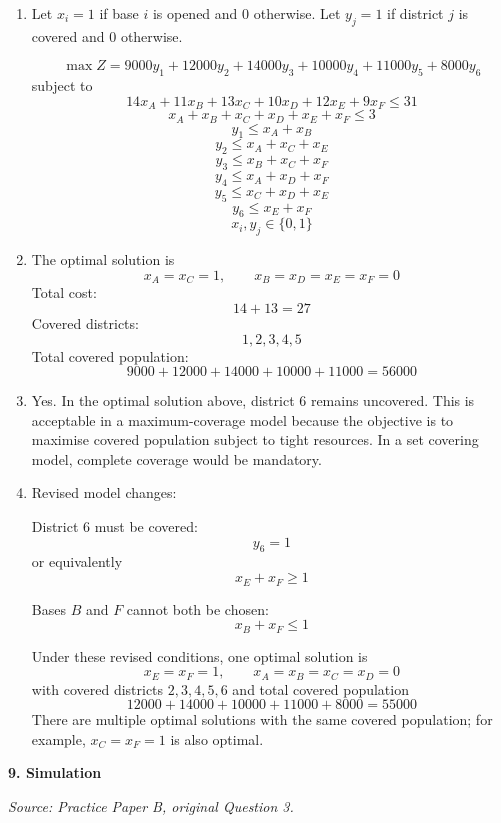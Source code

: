 \documentclass[11pt,a4paper]{article}
\begin{document}
\begin{enumerate}
\item Let $x_i=1$ if base $i$ is opened and 0 otherwise.
Let $y_j=1$ if district $j$ is covered and 0 otherwise.

\[
\max Z = 9000y_1+12000y_2+14000y_3+10000y_4+11000y_5+8000y_6
\]
subject to
\[
14x_A+11x_B+13x_C+10x_D+12x_E+9x_F \le 31
\]
\[
x_A+x_B+x_C+x_D+x_E+x_F \le 3
\]
\[
y_1 \le x_A+x_B
\]
\[
y_2 \le x_A+x_C+x_E
\]
\[
y_3 \le x_B+x_C+x_F
\]
\[
y_4 \le x_A+x_D+x_F
\]
\[
y_5 \le x_C+x_D+x_E
\]
\[
y_6 \le x_E+x_F
\]
\[
x_i,y_j \in \{0,1\}
\]

\item The optimal solution is
\[
x_A=x_C=1,\qquad x_B=x_D=x_E=x_F=0
\]
Total cost:
\[
14+13=27
\]
Covered districts:
\[
1,2,3,4,5
\]
Total covered population:
\[
9000+12000+14000+10000+11000=56000
\]

\item Yes. In the optimal solution above, district 6 remains uncovered. This is acceptable in a maximum-coverage model because the objective is to maximise covered population subject to tight resources. In a set covering model, complete coverage would be mandatory.

\item Revised model changes:

District 6 must be covered:
\[
y_6 = 1
\]
or equivalently
\[
x_E+x_F \ge 1
\]

Bases $B$ and $F$ cannot both be chosen:
\[
x_B+x_F \le 1
\]

Under these revised conditions, one optimal solution is
\[
x_E=x_F=1,\qquad x_A=x_B=x_C=x_D=0
\]
with covered districts $2,3,4,5,6$ and total covered population
\[
12000+14000+10000+11000+8000=55000
\]
There are multiple optimal solutions with the same covered population; for example, $x_C=x_F=1$ is also optimal.
\end{enumerate}

\newpage

\textbf{9. Simulation}

\textit{Source: Practice Paper B, original Question 3.}
\end{document}
